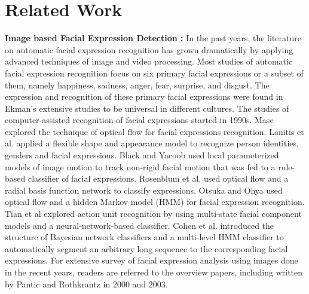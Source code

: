 \section{Related Work}
\textbf{Image based Facial Expression Detection : }In the past years, the literature on automatic facial expression recognition has grown dramatically by applying advanced techniques of image and video processing. Most studies of automatic facial expression recognition focus on six primary facial expressions or a subset of them, namely happiness, sadness, anger, fear, surprise, and disgust. The expression and recognition of these primary facial expressions were found in Ekman’s extensive studies\cite{ekman} to be universal in different cultures. The studies of computer-assisted recognition of facial expressions started in 1990s. Mase\cite{mase} explored the technique of optical flow for facial expressions recognition. Lanitis et al.\cite{lanitis} applied a flexible shape and appearance model to recognize person identities, genders and facial expressions. Black and Yacoob\cite{black95} used local parameterized models of image motion to track non-rigid facial motion that was fed to a rule-based classifier of facial expressions. Rosenblum et al.\cite{rosenblum} used optical flow and a radial basis function network to
classify expressions. Otsuka and Ohya\cite{otsuka97} used optical flow and a hidden Markov model (HMM) for facial expression
recognition. Tian et al\cite{tian} explored action unit recognition by using multi-state facial component models and a neural-network-based classifier. Cohen et al.\cite{cohen03} introduced the structure of Bayesian network classifiers and a multi-level HMM classifier to automatically segment an arbitrary long sequence to the corresponding facial expressions. For extensive survey of facial expression analysis using images done in the recent years, readers are referred to the overview papers, including \cite{pantic00,pantic03} written by Pantic and Rothkrantz in 2000 and 2003.\\

